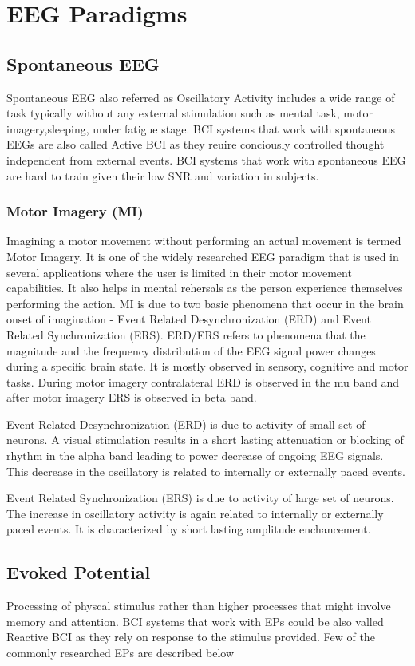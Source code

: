\section{EEG Paradigms}

\subsection{Spontaneous EEG}
Spontaneous EEG also referred as Oscillatory Activity includes a wide range of task typically without any external stimulation such as mental task, motor imagery,sleeping, 
under fatigue stage. BCI systems that work with spontaneous EEGs are also called Active BCI as they reuire conciously controlled thought independent from external events.
BCI systems that work with spontaneous EEG are hard to train given their low SNR and variation in subjects.

    \subsubsection{Motor Imagery (MI)}
Imagining a motor movement without performing an actual movement is termed Motor Imagery. It is one of the widely researched EEG paradigm that is used in several applications
where the user is limited in their motor movement capabilities. It also helps in mental rehersals as the person experience themselves performing the action. MI is due to
two basic phenomena that occur in the brain onset of imagination - Event Related Desynchronization (ERD) and Event Related Synchronization (ERS). ERD/ERS refers to 
phenomena that the magnitude and the frequency distribution of the EEG signal power changes during a specific brain state. It is mostly observed in sensory, cognitive
and motor tasks. During motor imagery contralateral ERD is observed in the mu band and after motor imagery ERS is observed in beta band.

Event Related Desynchronization (ERD) is due to activity of small set of neurons. A visual stimulation results in a short lasting attenuation or blocking of rhythm in the alpha 
band leading to power decrease of ongoing EEG signals. This decrease in the oscillatory is related to internally or externally paced events.

Event Related Synchronization (ERS) is due to activity of large set of neurons. The increase in oscillatory activity is again related to internally or externally paced events.
It is characterized by short lasting amplitude enchancement.

\subsection{Evoked Potential}
Processing of physcal stimulus rather than higher processes that might involve memory and attention. BCI systems that work with EPs could be also valled Reactive BCI as they
rely on response to the stimulus provided. Few of the commonly researched EPs are described below

